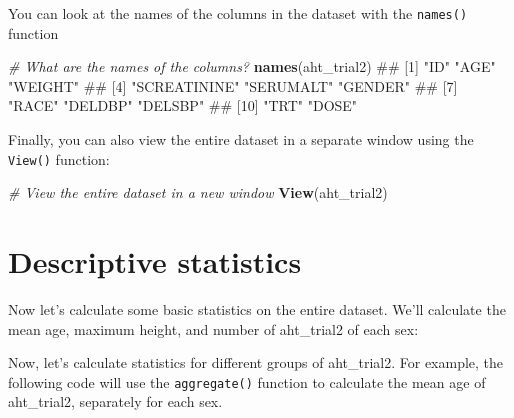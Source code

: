 \documentclass[12pt,]{krantz}
\makeatletter
\newenvironment{Shaded}{\begin{snugshade}}{\end{snugshade}}
\newcommand{\KeywordTok}[1]{\textcolor[rgb]{0.13,0.29,0.53}{\textbf{#1}}}
\newcommand{\CommentTok}[1]{\textcolor[rgb]{0.56,0.35,0.01}{\textit{#1}}}
\newcommand{\OperatorTok}[1]{\textcolor[rgb]{0.81,0.36,0.00}{\textbf{#1}}}
\newcommand{\NormalTok}[1]{#1}
\newenvironment{kframe}{%
\medskip{}
\setlength{\fboxsep}{.8em}
 \def\at@end@of@kframe{}%
 \ifinner\ifhmode%
  \def\at@end@of@kframe{\end{minipage}}%
  \begin{minipage}{\columnwidth}%
 \fi\fi%
 \def\FrameCommand##1{\hskip\@totalleftmargin \hskip-\fboxsep
 \colorbox{shadecolor}{##1}\hskip-\fboxsep
     \hskip-\linewidth \hskip-\@totalleftmargin \hskip\columnwidth}%
 \MakeFramed {\advance\hsize-\width
   \@totalleftmargin\z@ \linewidth\hsize
   \@setminipage}}%
 {\par\unskip\endMakeFramed%
 \at@end@of@kframe}
\renewenvironment{Shaded}{\begin{kframe}}{\end{kframe}}
\theoremstyle{definition}
\theoremstyle{definition}
\theoremstyle{remark}
\makeatother
\begin{document}
You can look at the names of the columns in the dataset with the
\texttt{names()} function

\begin{Shaded}
\begin{Highlighting}[]
\CommentTok{# What are the names of the columns?}
\KeywordTok{names}\NormalTok{(aht_trial2)}
\NormalTok{##  [1] "ID"          "AGE"         "WEIGHT"     }
\NormalTok{##  [4] "SCREATININE" "SERUMALT"    "GENDER"     }
\NormalTok{##  [7] "RACE"        "DELDBP"      "DELSBP"     }
\NormalTok{## [10] "TRT"         "DOSE"}
\end{Highlighting}
\end{Shaded}

Finally, you can also view the entire dataset in a separate window using
the \texttt{View()} function:

\begin{Shaded}
\begin{Highlighting}[]
\CommentTok{# View the entire dataset in a new window}
\KeywordTok{View}\NormalTok{(aht_trial2)}
\end{Highlighting}
\end{Shaded}

\section{Descriptive statistics}\label{descriptive-statistics}

Now let's calculate some basic statistics on the entire dataset. We'll
calculate the mean age, maximum height, and number of aht\_trial2 of
each sex:

\begin{Shaded}
\end{Shaded}

Now, let's calculate statistics for different groups of aht\_trial2. For
example, the following code will use the \texttt{aggregate()} function
to calculate the mean age of aht\_trial2, separately for each sex.
\end{document}
